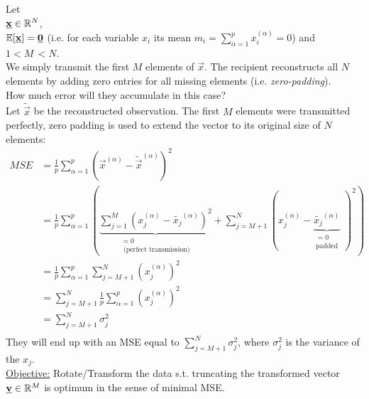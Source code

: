 Let\\[0.2cm]
$\underline{\mathbf{x}} \in \mathbb{R}^N$,\\
$\mathbb{E}[\underline{\mathbf{x}}] = \underline{\mathbf{0}}$ (i.e. for each variable $x_i$ its mean $m_i = \sum_{\alpha=1}^{p} x_i^{(\alpha)} = 0$) and $1 < M\, < N$.\\[0.2cm]
We simply transmit the first $M$ elements of $\vec x$. The recipient reconstructs all $N$ elements by adding zero entries for all missing elements (i.e. \textit{zero-padding}).\\[0.2cm]
How much error will they accumulate in this case?\\[0.2cm]
Let $\widetilde{\vec{x}}$ be the reconstructed observation. The first $M$ elements were transmitted perfectly, zero padding is used to extend the vector to its original size of $N$ elements:
\begin{align*}
MSE  &=  \frac{1}{p} \sum\limits_{\alpha = 1}^p ( \vec{x}^{(\alpha)} - \widetilde{\vec{x}}^{(\alpha)} )^2\\
     &=  \frac{1}{p} \sum\limits_{\alpha = 1}^p \left(\underbrace{\sum\limits_{j = 1}^M ( x_j^{(\alpha)} - \widetilde{x_j}^{(\alpha)} )^2}_{\substack{=0 \\\text{ (perfect transmission)}}} + \sum\limits_{j = M+1}^N ( x_j^{(\alpha)} - \underbrace{\widetilde{x_j}^{(\alpha)}}_{\substack{=0\\ \text{padded}}}\;)^2 \right)\\
     &=  \frac{1}{p} \sum\limits_{\alpha = 1}^p \sum\limits_{j = M+1}^N ( x_j^{(\alpha)} )^2 \\
     &=  \sum\limits_{j = M+1}^N \frac{1}{p} \sum\limits_{\alpha = 1}^p  ( x_j^{(\alpha)} )^2 \\
     &=  \sum\limits_{j = M+1}^N \sigma_j^2 \\
\end{align*}
They will end up with an MSE equal to $\sum_{j=M+1}^{N} \sigma_j^2$, where $\sigma_j^2$ is the variance of the $x_j$.\\

\underline{Objective:} Rotate/Transform the data s.t. truncating the transformed vector $\underline{\mathbf{v}} \in \mathbb{R}^M$ is optimum in the sense of minimal MSE.

